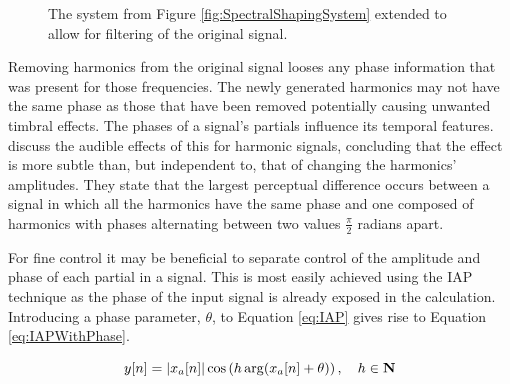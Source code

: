 \begin{figure}[h!]
			\caption{The system from Figure \ref{fig:SpectralShapingSystem} extended to allow for filtering of
				 the original signal.}
			\label{fig:SuperpositionSystem}
		\end{figure}

		Removing harmonics from the original signal looses any phase information that was present for those
		frequencies. The newly generated harmonics may not have the same phase as those that have been removed
		potentially causing unwanted timbral effects. The phases of a signal's partials influence its temporal
		features. \citet{plomp1969effect} discuss the audible effects of this for harmonic signals, concluding that
		the effect is more subtle than, but independent to, that of changing the harmonics' amplitudes. They state
		that the largest perceptual difference occurs between a signal in which all the harmonics have the same
		phase and one composed of harmonics with phases alternating between two values $\frac{\pi}{2}$ radians
		apart.

		For fine control it may be beneficial to separate control of the amplitude and phase of each partial in a
		signal. This is most easily achieved using the IAP technique as the phase of the input signal is already
		exposed in the calculation. Introducing a phase parameter, $\theta$, to Equation \ref{eq:IAP} gives rise to
		Equation \ref{eq:IAPWithPhase}.

		\begin{equation}
			y[n] = \left|x_{a}[n]\right| \cos \left( h\arg(x_{a}[n] + \theta) \right), \quad h \in \textbf{N}
			\label{eq:IAPWithPhase}
		\end{equation}

